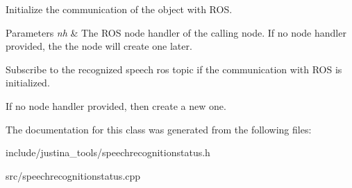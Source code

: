 Initialize the communication of the object with R\+OS. 


\begin{DoxyParams}{Parameters}
{\em nh} & The R\+OS node handler of the calling node. If no node handler provided, the the node will create one later. \\
\hline
\end{DoxyParams}
Subscribe to the recognized speech ros topic if the communication with R\+OS is initialized.

If no node handler provided, then create a new one.

The documentation for this class was generated from the following files\+:\begin{DoxyCompactItemize}
\item 
include/justina\+\_\+tools/speechrecognitionstatus.\+h\item 
src/speechrecognitionstatus.\+cpp\end{DoxyCompactItemize}
